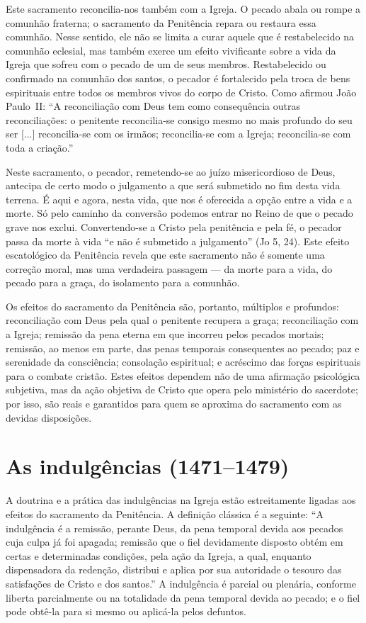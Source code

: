 Este sacramento reconcilia-nos também com a Igreja. O pecado abala ou rompe a comunhão fraterna; o sacramento da Penitência repara ou restaura essa comunhão. Nesse sentido, ele não se limita a curar aquele que é restabelecido na comunhão eclesial, mas também exerce um efeito vivificante sobre a vida da Igreja que sofreu com o pecado de um de seus membros. Restabelecido ou confirmado na comunhão dos santos, o pecador é fortalecido pela troca de bens espirituais entre todos os membros vivos do corpo de Cristo. Como afirmou João Paulo~II: ``A reconciliação com Deus tem como consequência outras reconciliações: o penitente reconcilia-se consigo mesmo no mais profundo do seu ser [...] reconcilia-se com os irmãos; reconcilia-se com a Igreja; reconcilia-se com toda a criação.''

Neste sacramento, o pecador, remetendo-se ao juízo misericordioso de Deus, antecipa de certo modo o julgamento a que será submetido no fim desta vida terrena. É aqui e agora, nesta vida, que nos é oferecida a opção entre a vida e a morte. Só pelo caminho da conversão podemos entrar no Reino de que o pecado grave nos exclui. Convertendo-se a Cristo pela penitência e pela fé, o pecador passa da morte à vida ``e não é submetido a julgamento'' (Jo 5, 24). Este efeito escatológico da Penitência revela que este sacramento não é somente uma correção moral, mas uma verdadeira passagem --- da morte para a vida, do pecado para a graça, do isolamento para a comunhão.

Os efeitos do sacramento da Penitência são, portanto, múltiplos e profundos: reconciliação com Deus pela qual o penitente recupera a graça; reconciliação com a Igreja; remissão da pena eterna em que incorreu pelos pecados mortais; remissão, ao menos em parte, das penas temporais consequentes ao pecado; paz e serenidade da consciência; consolação espiritual; e acréscimo das forças espirituais para o combate cristão. Estes efeitos dependem não de uma afirmação psicológica subjetiva, mas da ação objetiva de Cristo que opera pelo ministério do sacerdote; por isso, são reais e garantidos para quem se aproxima do sacramento com as devidas disposições.

\section{As indulgências (1471--1479)}

A doutrina e a prática das indulgências na Igreja estão estreitamente ligadas aos efeitos do sacramento da Penitência. A definição clássica é a seguinte: ``A indulgência é a remissão, perante Deus, da pena temporal devida aos pecados cuja culpa já foi apagada; remissão que o fiel devidamente disposto obtém em certas e determinadas condições, pela ação da Igreja, a qual, enquanto dispensadora da redenção, distribui e aplica por sua autoridade o tesouro das satisfações de Cristo e dos santos.'' A indulgência é parcial ou plenária, conforme liberta parcialmente ou na totalidade da pena temporal devida ao pecado; e o fiel pode obtê-la para si mesmo ou aplicá-la pelos defuntos.

